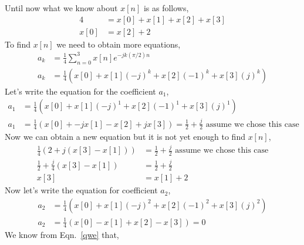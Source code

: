 \documentclass[10pt,a4paper, margin=1in]{article}
\begin{document}
\begin{enumerate}
\begin{enumerate}
    Until now what we know about $x[n]$ is as follows, 
    \begin{equation}
    \begin{split}
    	4 & = x[0] + x[1]+x[2]+x[3] \\
	x[0] & = x[2]+ 2 
    \end{split}
    \end{equation}
    To find $x[n] $ we need to obtain more equations,
    \begin{equation}
    \begin{split}
    	a_k & = \frac{1}{4} \sum_{n=0}^{3}x[n]e^{-jk(\pi/2)n}  \\
	a_k & = \frac{1}{4} \left(x[0] + x[1](-j)^k + x[2](-1)^k +x[3](j)^k \right) 
    \end{split}
    \end{equation} 
    Let's write the equation for the coefficient $a_1$,   
    \begin{equation}
    \begin{split}
    	a_1 & = \frac{1}{4} \left(x[0] + x[1](-j)^1 + x[2](-1)^1 +x[3](j)^1 \right) \\
	a_1 & = \frac{1}{4} \left(x[0] + -jx[1] - x[2] + jx[3] \right) = \frac{1}{2} + \frac{j}{2} \text{ assume we chose this case} 
    \end{split}
    \end{equation}    
    Now we can obtain a new equation but it is not yet enough to find $x[n]$,
    \begin{equation}
    \begin{split}
	\frac{1}{4} \left(2 + j(x[3] - x[1]) \right) & = \frac{1}{2} + \frac{j}{2} \text{ assume we chose this case} \\
	\frac{1}{2} + \frac{j}{4}(x[3] - x[1]) & =  \frac{1}{2} + \frac{j}{2}\\
	x[3] & = x[1] +2 
    \end{split}
    \end{equation}    
    Now let's write the equation for coefficient $a_2$,
    \begin{equation}
    \begin{split}
    	a_2 & = \frac{1}{4} \left(x[0] + x[1](-j)^2 + x[2](-1)^2 +x[3](j)^2 \right) \\
	a_2 & = \frac{1}{4} \left(x[0] - x[1] + x[2] - x[3] \right) = 0 
    \end{split}
    \end{equation}
    We know from Eqn.~\ref{qwe} that,
    \begin{equation}
    \begin{split}

\end{split}
\end{equation}
\end{enumerate}
\end{enumerate}
\end{document}
